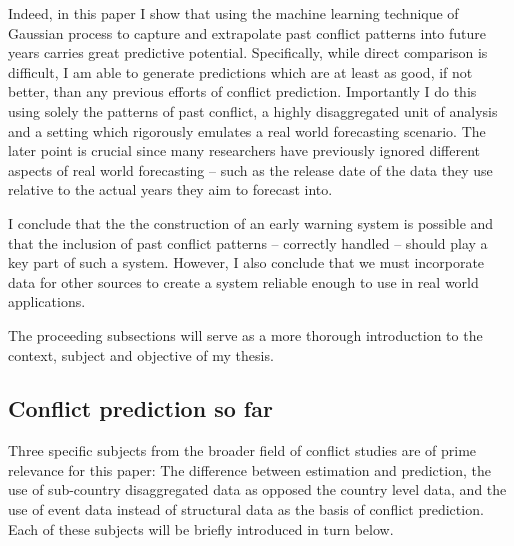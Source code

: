 \documentclass[a4paper]{article}
\begin{document}
Indeed, in this paper I show that using the machine learning technique of Gaussian process to capture and extrapolate past conflict patterns into future years carries great predictive potential. Specifically, while direct comparison is difficult, I am able to generate predictions which are at least as good, if not better, than any previous efforts of conflict prediction. Importantly I do this using solely the patterns of past conflict, a highly disaggregated unit of analysis and a setting which rigorously emulates a real world forecasting scenario. The later point is crucial since many researchers have previously ignored different aspects of real world forecasting -- such as the release date of the data they use relative to the actual years they aim to forecast into.\par

I conclude that the the construction of an early warning system is possible and that the inclusion of past conflict patterns -- correctly handled -- should play a key part of such a system. However, I also conclude that we must incorporate data for other sources to create a system reliable enough to use in real world applications.\par 


The proceeding subsections will serve as a more thorough introduction to the context, subject and objective of my thesis.\par

\subsection{Conflict prediction so far}

Three specific subjects from the broader field of conflict studies are of prime relevance for this paper: The difference between estimation and prediction, the use of sub-country disaggregated data as opposed the country level data, and the use of event data instead of structural data as the basis of conflict prediction. Each of these subjects will be briefly introduced in turn below.\par
\end{document}
